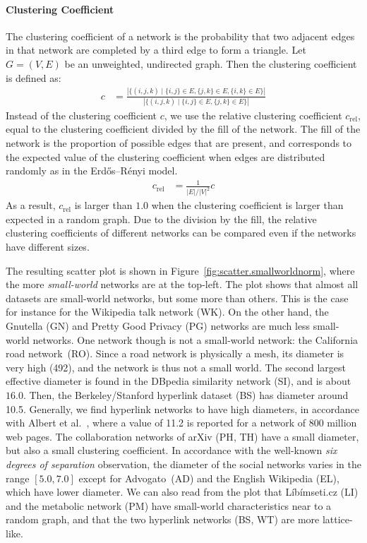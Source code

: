 \documentclass[11pt,a4paper]{book}
\begin{document}
\paragraph{Clustering Coefficient} 
The clustering coefficient of a network is the probability that two
adjacent edges in that network are completed by a third edge to form a
triangle.  Let $G=(V,E)$ be an unweighted, undirected graph.  Then the
clustering coefficient is defined as:
\begin{align}
  c &= \frac
  {\left|\{ (i,j,k) \mid \{i,j\} \in E, \{j,k\} \in E, \{i,k\} \in E \}\right|}
  {\left|\{ (i,j,k) \mid \{i,j\} \in E, \{j,k\} \in E \}\right|}
\label{eq:clustering-coefficient}
\end{align}
Instead of the                  
clustering coefficient $c$, we use the relative clustering coefficient
$c_{\mathrm{rel}}$, equal to the clustering coefficient divided by
the fill of the 
network.  The fill of the network is the proportion of possible edges
that are present, and corresponds to the expected value of the
clustering coefficient when edges are distributed randomly as in the
Erdős--Rényi model. 
\begin{align}
  c_{\mathrm{rel}} &= \frac 1 {|E|/|V|^2} c
\end{align}
As a result, $c_{\mathrm{rel}}$ is larger than $1.0$
when the clustering coefficient is larger than expected in a random
graph.  
Due to the division by the fill, the relative clustering coefficients of
different networks can be compared even if the networks have different
sizes. 

The resulting scatter plot is shown
in Figure~\ref{fig:scatter.smallworldnorm}, where the more
\emph{small-world} networks are at the top-left. 
The plot shows that almost all datasets are small-world networks, but
some more than others.  This is the case for instance for the Wikipedia
talk network (\textsf{WK}). On the other hand, the Gnutella (\textsf{GN})
and Pretty Good Privacy (\textsf{PG}) networks are much less small-world
networks.  One network though is not a small-world network: the California road
network~(\textsf{RO}).  Since a road network is physically a mesh, its diameter is
very high (492), and the network is thus not a small world.  
The
second largest effective diameter is found in the DBpedia similarity
network (\textsf{SI}), and is about $16.0$. 
Then, the Berkeley/Stanford
hyperlink dataset (\textsf{BS}) has diameter around 10.5.  Generally, we find
hyperlink networks to have high diameters, in accordance with Albert et
al.~\cite{b396}, where a value of 11.2 is reported for a network of 800
million web pages.  The collaboration networks of arXiv (\textsf{PH}, \textsf{TH}) have a
small diameter, but also a small clustering coefficient.  In accordance
with the well-known \emph{six degrees of separation} observation, the
diameter of the social networks varies in the range $[5.0,7.0]$ except for
Advogato~(\textsf{AD}) and the English Wikipedia (\textsf{EL}), which have lower diameter.
We can also read from the plot that Líbímseti.cz (\textsf{LI}) and the metabolic
network (\textsf{PM}) have small-world characteristics near to a random graph,
and that the two hyperlink networks (\textsf{BS}, \textsf{WT}) are more lattice-like.
\end{document}
